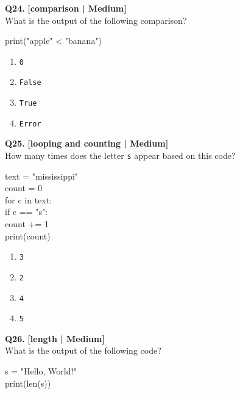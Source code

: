 \noindent\textbf{Q24.} \hfill {\small\color{LPUOrange}\textbf{[comparison | Medium]}}\\[2pt]
What is the output of the following comparison? 

\begin{pycode}
print("apple" < "banana")
\end{pycode}

\begin{enumerate}[label=(\alph*),topsep=2pt,itemsep=1pt,partopsep=0pt,parsep=0pt]
    \item \relax \texttt{0}
    \item \relax \texttt{False}
    \item \relax \texttt{True}
    \item \relax \texttt{Error}
\end{enumerate}
\vspace{2mm}

\noindent\textbf{Q25.} \hfill {\small\color{LPUOrange}\textbf{[looping and counting | Medium]}}\\[2pt]
How many times does the letter \texttt{s} appear based on this code? 

\begin{pycode}
text = "mississippi"\\
count = 0\\
for c in text:\\
if c == "s":\\
count += 1\\
print(count)
\end{pycode}

\begin{enumerate}[label=(\alph*),topsep=2pt,itemsep=1pt,partopsep=0pt,parsep=0pt]
    \item \relax \texttt{3}
    \item \relax \texttt{2}
    \item \relax \texttt{4}
    \item \relax \texttt{5}
\end{enumerate}
\vspace{2mm}

\noindent\textbf{Q26.} \hfill {\small\color{LPUOrange}\textbf{[length | Medium]}}\\[2pt]
What is the output of the following code? 

\begin{pycode}
s = "Hello, World!"\\
print(len(s))
\end{pycode}


